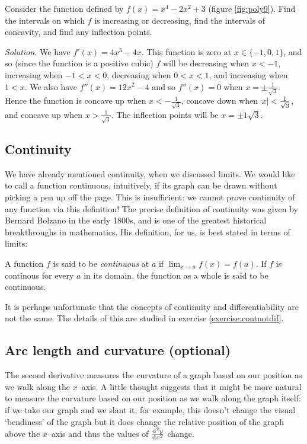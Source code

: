 \begin{ex}
  Consider the function defined by $ f(x) = x^4 - 2x^2 + 3 $ (figure \ref{fig:poly9}). Find the intervals on which $ f $
  is increasing or decreasing, find the intervals of concavity, and find any inflection points.

  \textit{Solution.} We have $ f'(x) = 4x^3 - 4x $. This function is zero at $ x \in \{-1, 0, 1\} $, and so (since the function
  is a positive cubic) $ f $ will be decreasing when $ x < -1 $, increasing when $ -1 < x < 0 $, decreasing when $ 0 < x < 1 $,
  and increasing when $ 1 < x $. We also have $ f''(x) = 12x^2 - 4 $ and so $ f''(x) = 0 $ when $ x = \pm \frac{1}{\sqrt{3}} $.
  Hence the function is concave up when $ x < -\frac{1}{\sqrt{3}} $, concave down when $ \abs{x} < \frac{1}{\sqrt{3}} $, and concave
  up when $ x > \frac{1}{\sqrt{3}} $. The inflection points will be $ x = \pm{1}{\sqrt{3}} $.
\end{ex}

\subsection{Continuity}
We have already mentioned continuity, when we discussed limits. We would like to call a
function continuous, intuitively, if its graph can be drawn without picking a pen up off
the page. This is insufficient: we cannot prove continuity of any function via this
definition! The precise definition of continuity was given by Bernard Bolzano in the early
1800s, and is one of the greatest historical breakthroughs in mathematics. His definition,
for us, is best stated in terms of limits:
\begin{defn}
  A function $ f $ is said to be \emph{continuous} at $ a $ if $ \lim_{x \to a} f(x) = f(a) $. If $ f $
  is continous for every $ a $ in its domain, the function as a whole is said to be continuous.
\end{defn}

It is perhaps unfortunate that the concepts of continuity and differentiability are not the same. The details of this
are studied in exercise \ref{exercise:contnotdif}.

\subsection{Arc length and curvature (optional)}
The second derivative measures the curvature of a graph based on our position as we walk along the $ x$--axis. A little thought
suggests that it might be more natural to measure the curvature based on our position as we walk along the graph itself: if we
take our graph and we slant it, for example, this doesn't change the visual `bendiness' of the graph but it does change the
relative position of the graph above the $ x$--axis and thus the values of $ \od[2]{y}{x} $ change.

